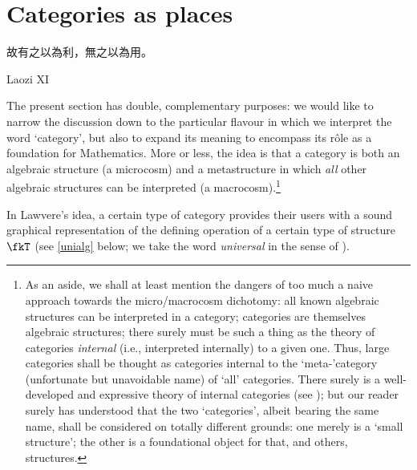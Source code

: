\section{Categories as places}\label{as_places}
\epigraph{\begin{CJK}{UTF8}{bsmi} 故有之以為利，無之以為用。 \end{CJK}}{Laozi XI}
The present section has double, complementary purposes: we would like to narrow the discussion down to the particular flavour in which we interpret the word `category', but also to expand its meaning to encompass its r\^ole as a foundation for Mathematics. More or less, the idea is that a category is both an algebraic structure (a microcosm) and a metastructure in which \emph{all} other algebraic structures can be interpreted (a macrocosm).\footnote{As an aside, we shall at least mention the dangers of too much a naive approach towards the micro/macrocosm dichotomy: all known algebraic structures can be interpreted in a category; categories are themselves algebraic structures; there surely must be such a thing as the theory of categories \emph{internal} (i.e., interpreted internally) to a given one. Thus, large categories shall be thought as categories internal to the `meta-'category (unfortunate but unavoidable name) of `all' categories. There surely is a well-developed and expressive theory of internal categories (see \cite[Ch. 8]{Bor1}); but our reader surely has understood that the two `categories', albeit bearing the same name, shall be considered on totally different grounds: one merely is a `small structure'; the other is a foundational object for that, and others, structures.}

In Lawvere's idea, a certain type of category provides their users with a sound graphical representation of the defining operation of a certain type of structure $\fkT$ (see \autoref{unialg} below; we take the word \emph{universal} in the sense of \cite[XV.1]{grillet2007abstract}).


